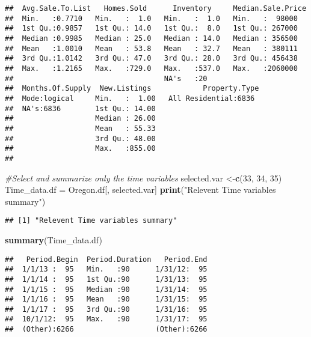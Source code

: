 \documentclass[]{article}
\newenvironment{Shaded}{\begin{snugshade}}{\end{snugshade}}
\newcommand{\KeywordTok}[1]{\textcolor[rgb]{0.13,0.29,0.53}{\textbf{#1}}}
\newcommand{\DecValTok}[1]{\textcolor[rgb]{0.00,0.00,0.81}{#1}}
\newcommand{\StringTok}[1]{\textcolor[rgb]{0.31,0.60,0.02}{#1}}
\newcommand{\CommentTok}[1]{\textcolor[rgb]{0.56,0.35,0.01}{\textit{#1}}}
\newcommand{\NormalTok}[1]{#1}
\begin{document}
\begin{verbatim}
##  Avg.Sale.To.List   Homes.Sold      Inventory     Median.Sale.Price
##  Min.   :0.7710   Min.   :  1.0   Min.   :  1.0   Min.   :  98000  
##  1st Qu.:0.9857   1st Qu.: 14.0   1st Qu.:  8.0   1st Qu.: 267000  
##  Median :0.9985   Median : 25.0   Median : 14.0   Median : 356500  
##  Mean   :1.0010   Mean   : 53.8   Mean   : 32.7   Mean   : 380111  
##  3rd Qu.:1.0142   3rd Qu.: 47.0   3rd Qu.: 28.0   3rd Qu.: 456438  
##  Max.   :1.2165   Max.   :729.0   Max.   :537.0   Max.   :2060000  
##                                   NA's   :20                       
##  Months.Of.Supply  New.Listings            Property.Type 
##  Mode:logical     Min.   :  1.00   All Residential:6836  
##  NA's:6836        1st Qu.: 14.00                         
##                   Median : 26.00                         
##                   Mean   : 55.33                         
##                   3rd Qu.: 48.00                         
##                   Max.   :855.00                         
## 
\end{verbatim}

\begin{Shaded}
\begin{Highlighting}[]
\CommentTok{#Select and summarize only the time variables }
\NormalTok{selected.var <-}\KeywordTok{c}\NormalTok{(}\DecValTok{33}\NormalTok{, }\DecValTok{34}\NormalTok{, }\DecValTok{35}\NormalTok{)}
\NormalTok{Time_data.df =}\StringTok{ }\NormalTok{Oregon.df[, selected.var]}
\KeywordTok{print}\NormalTok{(}\StringTok{"Relevent Time variables summary"}\NormalTok{)}
\end{Highlighting}
\end{Shaded}

\begin{verbatim}
## [1] "Relevent Time variables summary"
\end{verbatim}

\begin{Shaded}
\begin{Highlighting}[]
\KeywordTok{summary}\NormalTok{(Time_data.df)}
\end{Highlighting}
\end{Shaded}

\begin{verbatim}
##   Period.Begin  Period.Duration   Period.End  
##  1/1/13 :  95   Min.   :90      1/31/12:  95  
##  1/1/14 :  95   1st Qu.:90      1/31/13:  95  
##  1/1/15 :  95   Median :90      1/31/14:  95  
##  1/1/16 :  95   Mean   :90      1/31/15:  95  
##  1/1/17 :  95   3rd Qu.:90      1/31/16:  95  
##  10/1/12:  95   Max.   :90      1/31/17:  95  
##  (Other):6266                   (Other):6266
\end{verbatim}
\end{document}
